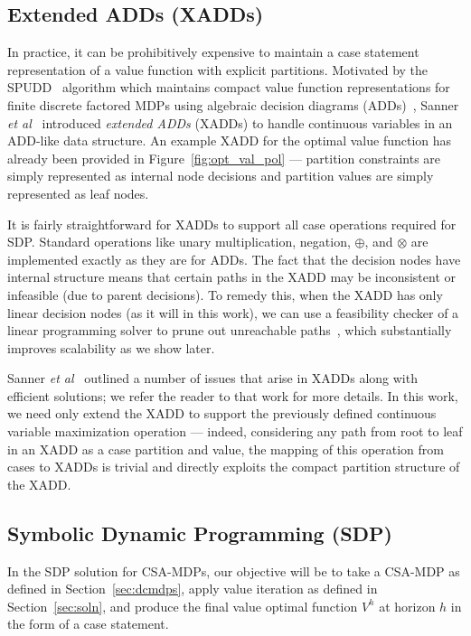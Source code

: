\subsection{Extended ADDs (XADDs)}


In practice, it can be prohibitively expensive to maintain a case
statement representation of a value function with explicit partitions.
Motivated by the SPUDD~\cite{spudd} algorithm which maintains compact
value function representations for finite discrete factored MDPs using
algebraic decision diagrams (ADDs)~\cite{bahar93add}, Sanner {\it et
al}~\cite{sanner_uai11} introduced \emph{extended ADDs} (XADDs) to handle
continuous variables in an ADD-like data structure.  An
example XADD for the optimal \MarsRover value function has already
been provided in Figure~\ref{fig:opt_val_pol} --- partition
constraints are simply represented as internal node decisions and
partition values are simply represented as leaf nodes.

It is fairly straightforward for XADDs to support all case operations
required for SDP.  Standard operations like unary multiplication,
negation, $\oplus$, and $\otimes$ are implemented exactly as they are
for ADDs.  The fact that the decision nodes have internal structure
means that certain paths in the XADD may be inconsistent or infeasible
(due to parent decisions).  To remedy this, when the XADD has only
linear decision nodes (as it will in this work), we can use a 
feasibility checker of a linear programming solver
to prune out unreachable paths~\cite{sanner_uai11}, which substantially
improves scalability as we show later.

Sanner {\it et al}~\cite{sanner_uai11} outlined a number of issues
that arise in XADDs along with efficient solutions; we refer the
reader to that work for more details.  In this work, we need only
extend the XADD to support the previously defined continuous variable
maximization operation --- indeed, considering any path from root to
leaf in an XADD as a case partition and value, the mapping of this
operation from cases to XADDs is trivial and directly exploits
the compact partition structure of the XADD.

\subsection{Symbolic Dynamic Programming (SDP)}

In the SDP solution for CSA-MDPs, our objective will be to take
a CSA-MDP as defined in Section~\ref{sec:dcmdps}, apply value
iteration as defined in Section~\ref{sec:soln}, and produce
the final value optimal function $V^h$ at horizon $h$ in the form
of a case statement.

